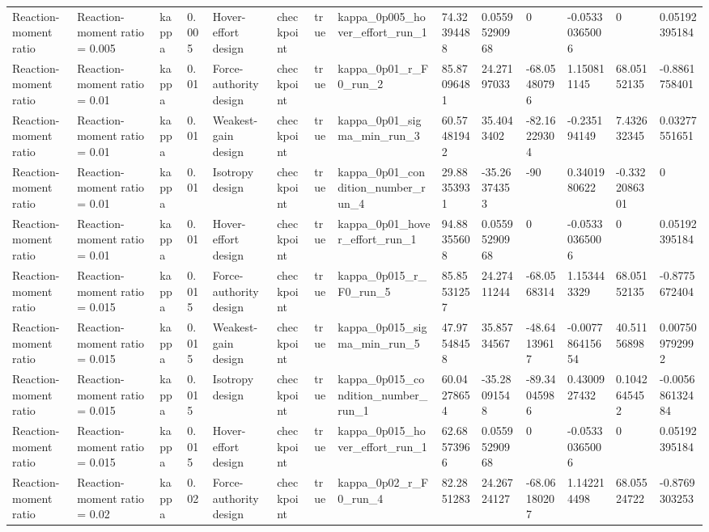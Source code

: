 \begin{tabular}{@{}llllllllllllll@{}}
Reaction-moment ratio & Reaction-moment ratio = 0.005 & kappa & 0.005 & Hover-effort design & checkpoint & true & kappa\_0p005\_hover\_effort\_run\_1 & 74.32394488 & 0.05595290968 & 0 & -0.05330365006 & 0 & 0.05192395184 \\
Reaction-moment ratio & Reaction-moment ratio = 0.01 & kappa & 0.01 & Force-authority design & checkpoint & true & kappa\_0p01\_r\_F0\_run\_2 & 85.87096481 & 24.27197033 & -68.05480796 & 1.150811145 & 68.05152135 & -0.8861758401 \\
Reaction-moment ratio & Reaction-moment ratio = 0.01 & kappa & 0.01 & Weakest-gain design & checkpoint & true & kappa\_0p01\_sigma\_min\_run\_3 & 60.57481942 & 35.4043402 & -82.16229304 & -0.235194149 & 7.432632345 & 0.03277551651 \\
Reaction-moment ratio & Reaction-moment ratio = 0.01 & kappa & 0.01 & Isotropy design & checkpoint & true & kappa\_0p01\_condition\_number\_run\_4 & 29.88353931 & -35.26374353 & -90 & 0.3401980622 & -0.3322086301 & 0 \\
Reaction-moment ratio & Reaction-moment ratio = 0.01 & kappa & 0.01 & Hover-effort design & checkpoint & true & kappa\_0p01\_hover\_effort\_run\_1 & 94.88355608 & 0.05595290968 & 0 & -0.05330365006 & 0 & 0.05192395184 \\
Reaction-moment ratio & Reaction-moment ratio = 0.015 & kappa & 0.015 & Force-authority design & checkpoint & true & kappa\_0p015\_r\_F0\_run\_5 & 85.85531257 & 24.27411244 & -68.0568314 & 1.153443329 & 68.05152135 & -0.8775672404 \\
Reaction-moment ratio & Reaction-moment ratio = 0.015 & kappa & 0.015 & Weakest-gain design & checkpoint & true & kappa\_0p015\_sigma\_min\_run\_5 & 47.97548458 & 35.85734567 & -48.64139617 & -0.007786415654 & 40.51156898 & 0.007509792992 \\
Reaction-moment ratio & Reaction-moment ratio = 0.015 & kappa & 0.015 & Isotropy design & checkpoint & true & kappa\_0p015\_condition\_number\_run\_1 & 60.04278654 & -35.28091548 & -89.34045986 & 0.4300927432 & 0.1042645452 & -0.005686132484 \\
Reaction-moment ratio & Reaction-moment ratio = 0.015 & kappa & 0.015 & Hover-effort design & checkpoint & true & kappa\_0p015\_hover\_effort\_run\_1 & 62.68573966 & 0.05595290968 & 0 & -0.05330365006 & 0 & 0.05192395184 \\
Reaction-moment ratio & Reaction-moment ratio = 0.02 & kappa & 0.02 & Force-authority design & checkpoint & true & kappa\_0p02\_r\_F0\_run\_4 & 82.2851283 & 24.26724127 & -68.06180207 & 1.142214498 & 68.05524722 & -0.8769303253 \\

\end{tabular}
